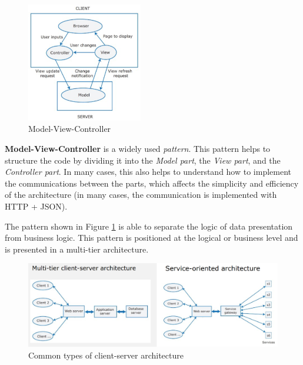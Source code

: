 \begin{figure}
\includegraphics[width=0.45\textwidth]{images/SoftwareArchitecture/MVC.png}
    \caption{Model-View-Controller}
    \label{fig:MVC}
\end{figure}

\vspace{0.5cm}
\textbf{Model-View-Controller} is a widely used \emph{pattern}. This pattern helps to structure the code by dividing it into the \textit{Model part}, the \textit{View part}, and the \textit{Controller part}. In many cases, this also helps to understand how to implement the communications between the parts, which affects the simplicity and efficiency of the architecture (in many cases, the communication is implemented with HTTP + JSON). 

The pattern shown in Figure \ref{fig:MVC} is able to separate the logic of data presentation from business logic. This pattern is positioned at the logical or business level and is presented in a multi-tier architecture.

\newpage

\begin{figure} [H]
    \centering
    \includegraphics[width=1\textwidth]{images/SoftwareArchitecture/architectures.png}
    \caption{Common types of client-server architecture}
    \label{fig:architectures}
\end{figure}

